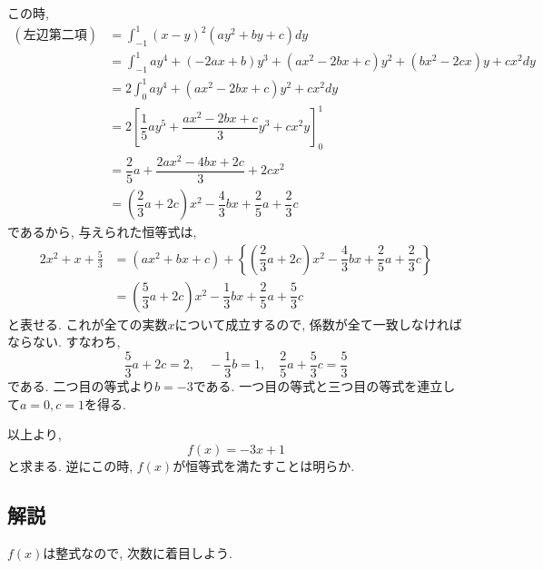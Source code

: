 \documentclass[dvipdfmx,a4paper]{jsarticle}
\newcommand{\2}{I\hspace{-1pt}I}
\newcommand{\3}{I\hspace{-1pt}I\hspace{-1pt}I}
\begin{document}
    この時, 
    \begin{align*}
        \mathrm{(左辺第二項)} 
        &= \int_{-1}^1 (x-y)^2 (ay^2 + by + c) dy \\
        &= \int_{-1}^1 ay^4 +(-2ax + b)y^3 +(ax^2 -2bx+ c)y^2 +(bx^2 -2cx)y + cx^2 dy \\
        &= 2\int_{0}^1 ay^4 +(ax^2-2bx + c)y^2 + cx^2 dy \\
        &= 2\left[\dfrac{1}{5}a y^5 + \dfrac{ax^2-2bx + c}{3} y^3 + cx^2 y\right]_0^1 \\
        &= \dfrac{2}{5}a + \dfrac{2ax^2-4bx + 2c}{3} + 2cx^2 \\
        &= \left(\dfrac{2}{3}a+2c\right)x^2 -\dfrac{4}{3}bx + \dfrac{2}{5}a + \dfrac{2}{3}c
    \end{align*}
    であるから, 与えられた恒等式は, 
    \begin{align*}
        2x^2 + x + \frac{5}{3} 
        &= (ax^2+bx+c) + \left\{\left(\dfrac{2}{3}a+2c\right)x^2 -\dfrac{4}{3}bx + \dfrac{2}{5}a + \dfrac{2}{3}c\right\} \\
        &= \left(\dfrac{5}{3}a+2c\right)x^2 - \dfrac{1}{3}bx + \dfrac{2}{5}a + \dfrac{5}{3}c
    \end{align*}
    と表せる. これが全ての実数$x$について成立するので, 係数が全て一致しなければならない. 
    すなわち, 
    \begin{equation*}
        \dfrac{5}{3}a+2c = 2, \quad -\dfrac{1}{3}b = 1, \quad \dfrac{2}{5}a + \dfrac{5}{3}c = \frac{5}{3} 
    \end{equation*}
    である. 二つ目の等式より$b = -3$である. 
    一つ目の等式と三つ目の等式を連立して$a = 0, c = 1$を得る. 
    

    以上より, 
    \begin{equation*}
        f(x) = -3x + 1
    \end{equation*}
    と求まる. 逆にこの時, $f(x)$が恒等式を満たすことは明らか. 

    \subsection{解説}
    $f(x)$は整式なので, 次数に着目しよう. 
\end{document}
